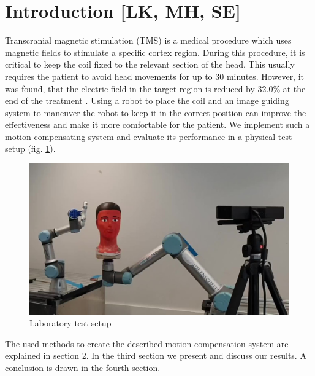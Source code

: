 \section{Introduction [LK, MH, SE]}


Transcranial magnetic stimulation (TMS) is a medical procedure which uses magnetic fields to stimulate a specific cortex region. During this procedure, it is critical to keep the coil fixed to the relevant section of the head.
This usually requires the patient to avoid head movements for up to 30 minutes. However, it was found, that the electric field in the target region is reduced by 32.0\% at the end of the treatment \cite{TMS_Schlaefer}.
Using a robot to place the coil and an image guiding system to maneuver the robot to keep it in the correct position can improve the effectiveness and make it more comfortable for the patient.
We implement such a motion compensating system and evaluate its performance in a physical test setup (fig. \ref{headtrackingsetup}).

\begin{figure}[ht]
	\centering
 	\includegraphics[width=\linewidth]{headtracking_image}
 	\caption{Laboratory test setup}
 	\label{headtrackingsetup}
 \end{figure}
The used methods to create the described motion compensation system are explained in section 2. In the third section we present and discuss our results. A conclusion is drawn in the fourth section.

